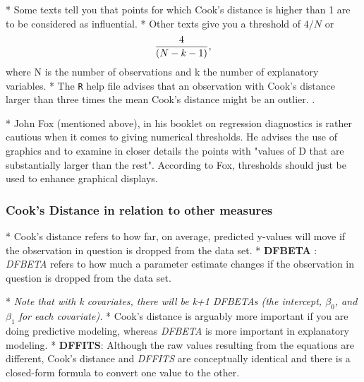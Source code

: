 *  Some texts tell you that points for which Cook's distance is higher than 1 are to be considered as influential. 
*  Other texts give you a threshold of $4/N$ or \[ {4  \over (N-k-1)} ,\] where N is the number of observations and k the number of explanatory variables. 
*  The \texttt{R} help file advises that an observation with Cook's distance larger than three times the mean Cook's distance might be an outlier. .

*  John Fox (mentioned above), in his booklet on regression diagnostics is rather cautious when it comes to giving numerical thresholds. He advises the use of graphics and to examine in closer details the points with "values of D that are substantially larger than the rest". According to Fox, thresholds should just be used to enhance graphical displays.






\subsubsection*{Cook's Distance in relation to other measures}


*  Cook's distance refers to how far, on average, predicted y-values will move if the observation in question is dropped from the data set. 
*  \textbf{DFBETA} :  \textit{DFBETA} refers to how much a parameter estimate changes if the observation in question is dropped from the data set.

*   \textit{Note that with k covariates, there will be k+1 DFBETAs (the intercept, $\beta_0$, and $\beta_1$ for each covariate).}
*   Cook's distance is arguably more important if you are doing predictive modeling, whereas \textit{DFBETA} is more important in explanatory modeling.
*  \textbf{DFFITS}: Although the raw values resulting from the equations are different, Cook's distance and \textit{DFFITS} are conceptually identical and there is a closed-form formula to convert one value to the other.



